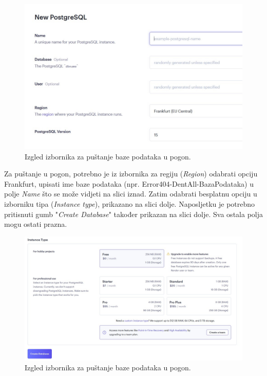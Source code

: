 			\begin{figure}[H]
				\includegraphics[width=\linewidth]{slike/PostgreSQLprviDio.JPG}
				\centering
				\caption{Izgled izbornika za puštanje baze podataka u pogon.}
				\label{fig:PostgreSQL izbornik prvi dio}
			\end{figure}
			Za puštanje u pogon, potrebno je iz izbornika za regiju (\textit{Region}) odabrati opciju Frankfurt, upisati ime baze podataka (npr. Error404-DentAll-BazaPodataka) u polje \textit{Name} što se može vidjeti na slici iznad. Zatim odabrati besplatnu opciju u izborniku tipa (\textit{Instance type}), prikazano na slici dolje. Naposljetku je potrebno pritisnuti gumb "\textit{Create Database}" također prikazan na slici dolje. Sva ostala polja mogu ostati prazna.
			\begin{figure}[H]
				\includegraphics[width=\linewidth]{slike/PostgreSQLdrugiDio.JPG}
				\centering
				\caption{Izgled izbornika za puštanje baze podataka u pogon.}
				\label{fig:PostgreSQL izbornik drugi dio}
			\end{figure}
